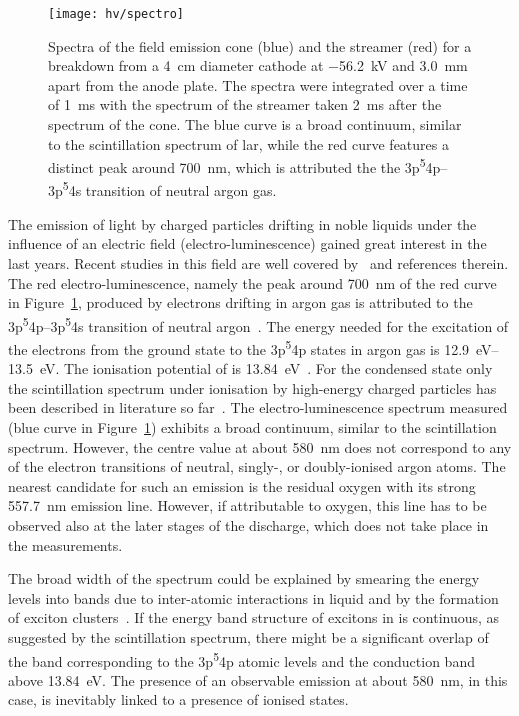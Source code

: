 \begin{figure}[htb]
	\centering
	\texttt{[image: hv/spectro]}
	\caption[ test field emission and streamer spectra]{%
		Spectra of the field emission cone (blue) and the streamer (red) for a breakdown from a \SI{4}{\centi\metre} diameter cathode at \SI{-56.2}{\kilo\volt} and \SI{3.0}{\milli\metre} apart from the anode plate.
		The spectra were integrated over a time of \SI{1}{\milli\second} with the spectrum of the streamer taken \SI{2}{\milli\second} after the spectrum of the cone.
		The blue curve is a broad continuum, similar to the scintillation spectrum of \acrshort{lar}, while the red curve features a distinct peak around \SI{700}{\nano\metre}, which is attributed the the 3p\textsuperscript{5}4p--3p\textsuperscript{5}4s transition of neutral argon gas.
	}
	\label{fig:hv_spectro}
\end{figure}

The emission of light by charged particles drifting in noble liquids under the influence of an electric field (electro-luminescence) gained great interest in the last years.
Recent studies in this field are well covered by~\cite{buzulutskov1, buzulutskov2, buzulutskov3} and references therein.
The red electro-luminescence, namely the peak around \SI{700}{\nano\metre} of the red curve in Figure~\ref{fig:hv_spectro}, produced by electrons drifting in argon gas is attributed to the 3p\textsuperscript{5}4p--3p\textsuperscript{5}4s transition of neutral argon~\cite{Boffard}.
The energy needed for the excitation of the electrons from the ground state to the 3p\textsuperscript{5}4p states in argon gas is \SIrange{12.9}{13.5}{\electronvolt}.
The ionisation potential of \lar{} is \SI{13.84}{\electronvolt}~\cite{2photonAbs}.
For the condensed state only the scintillation spectrum under ionisation by high-energy charged particles has been described in literature so far~\cite{Heindl}.
The electro-luminescence spectrum measured (blue curve in Figure~\ref{fig:hv_spectro}) exhibits a broad continuum, similar to the scintillation spectrum.
However, the centre value at about \SI{580}{\nano\metre} does not correspond to any of the electron transitions of neutral, singly-, or doubly-ionised argon atoms.
The nearest candidate for such an emission is the residual oxygen with its strong \SI{557.7}{\nano\metre} emission line.
However, if attributable to oxygen, this line has to be observed also at the later stages of the discharge, which does not take place in the measurements.

The broad width of the spectrum could be explained by smearing the energy levels into bands due to inter-atomic interactions in liquid and by the formation of exciton clusters~\cite{Bernstorff, Foerstel}.
If the energy band structure of excitons in \lar{} is continuous, as suggested by the scintillation spectrum, there might be a significant overlap of the band corresponding to the 3p\textsuperscript{5}4p atomic levels and the conduction band above \SI{13.84}{\electronvolt}.
The presence of an observable emission at about \SI{580}{\nano\metre}, in this case, is inevitably linked to a presence of ionised states.

